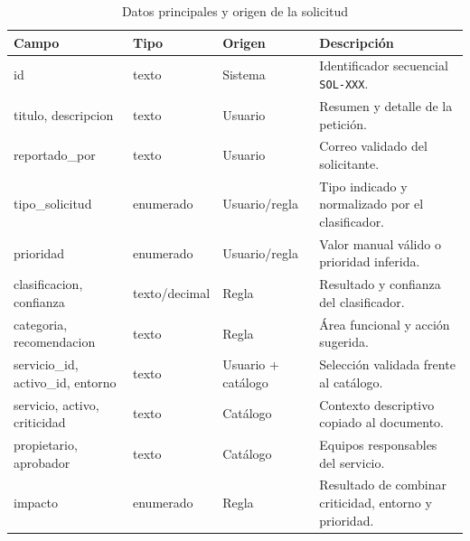 \begin{table}[H]
\centering
\scriptsize
\begin{tabularx}{\textwidth}{l l l X}
\textbf{Campo} & \textbf{Tipo} & \textbf{Origen} & \textbf{Descripción} \\
\hline
id & texto & Sistema & Identificador secuencial \texttt{SOL-XXX}. \\
titulo, descripcion & texto & Usuario & Resumen y detalle de la petición. \\
reportado\_por & texto & Usuario & Correo validado del solicitante. \\
tipo\_solicitud & enumerado & Usuario/regla & Tipo indicado y normalizado por el clasificador. \\
prioridad & enumerado & Usuario/regla & Valor manual válido o prioridad inferida. \\
clasificacion, confianza & texto/decimal & Regla & Resultado y confianza del clasificador. \\
categoria, recomendacion & texto & Regla & Área funcional y acción sugerida. \\
servicio\_id, activo\_id, entorno & texto & Usuario + catálogo & Selección validada frente al catálogo. \\
servicio, activo, criticidad & texto & Catálogo & Contexto descriptivo copiado al documento. \\
propietario, aprobador & texto & Catálogo & Equipos responsables del servicio. \\
impacto & enumerado & Regla & Resultado de combinar criticidad, entorno y prioridad. \\
\end{tabularx}
\caption{Datos principales y origen de la solicitud}
\label{tabla:datos-solicitud-principales}
\end{table}

